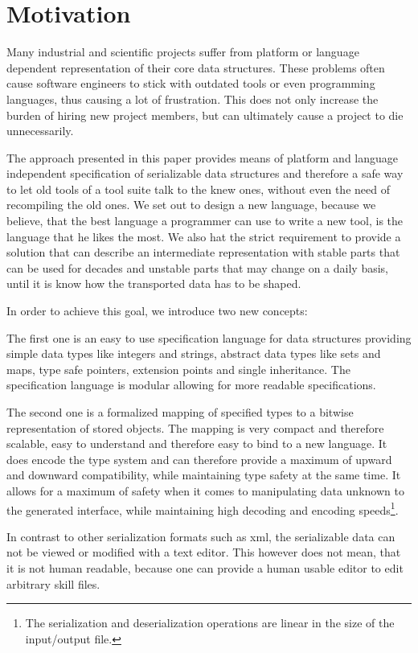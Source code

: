\section{Motivation}

Many industrial and scientific projects suffer from platform or language dependent representation of their core data structures. These problems often cause software engineers to stick with outdated tools or even programming languages, thus causing a lot of frustration. This does not only increase the burden of hiring new project members, but can ultimately cause a project to die unnecessarily.

The approach presented in this paper provides means of platform and language independent specification of serializable data structures and therefore a safe way to let old tools of a tool suite talk to the knew ones, without even the need of recompiling the old ones. We set out to design a new language, because we believe, that the best language a programmer can use to write a new tool, is the language that he likes the most. We also hat the strict requirement to provide a solution that can describe an intermediate representation with stable parts that can be used for decades and unstable parts that may change on a daily basis, until it is know how the transported data has to be shaped.

In order to achieve this goal, we introduce two new concepts:

The first one is an easy to use specification language for data structures providing simple data types like integers and strings, abstract data types like sets and maps, type safe pointers, extension points and single inheritance. The specification language is modular allowing for more readable specifications.

The second one is a formalized mapping of specified types to a bitwise representation of stored objects. The mapping is very compact and therefore scalable, easy to understand and therefore easy to bind to a new language. It does encode the type system and can therefore provide a maximum of upward and downward compatibility, while maintaining type safety at the same time. It allows for a maximum of safety when it comes to manipulating data unknown to the generated interface, while maintaining high decoding and encoding speeds\footnote{The serialization and deserialization operations are linear in the size of the input/output file.}.

In contrast to other serialization formats such as \gls{xml}, the serializable data can not be viewed or modified with a text editor. This however does not mean, that it is not human readable, because one can provide a human usable editor to edit arbitrary \gls{skill} files.

